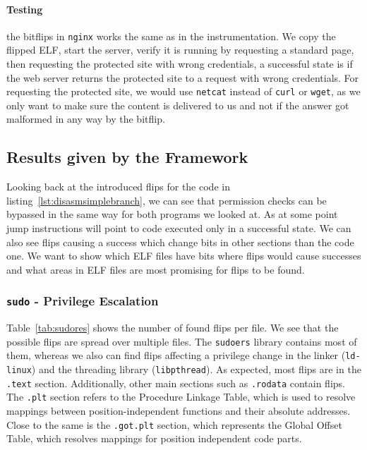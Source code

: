 \paragraph{Testing} the bitflips in \texttt{nginx} works the same as in the
instrumentation. We copy the flipped ELF, start the server, verify it is running
by requesting a standard page, then requesting the protected site with wrong
credentials, a successful state is if the web server returns the protected site
to a request with wrong credentials. For requesting the protected site, we would
use \texttt{netcat} instead of \texttt{curl} or \texttt{wget}, as we only want
to make sure the content is delivered to us and not if the answer got malformed
in any way by the bitflip.

\subsection{Results given by the Framework}

Looking back at the introduced flips for the code in
listing~\ref{lst:disasmsimplebranch}, we can see that permission checks can be
bypassed in the same way for both programs we looked at. As at some point jump
instructions will point to code executed only in a successful state. We can also
see flips causing a success which change bits in other sections than the code
one. We want to show which ELF files have bits where flips would cause
successes and what areas in ELF files are most promising for flips to be found.

\subsubsection{\texttt{sudo} - Privilege Escalation}

Table~\ref{tab:sudores} shows the number of found flips per file. We see that
the possible flips are spread over multiple files.  The \texttt{sudoers} library
contains most of them, whereas we also can find flips affecting a privilege
change in the linker (\texttt{ld-linux}) and the threading library
(\texttt{libpthread}). As expected, most flips are in the \texttt{.text}
section. Additionally, other main sections such as \texttt{.rodata} contain
flips. The \texttt{.plt} section refers to the Procedure Linkage Table, which is
used to resolve mappings between position-independent functions and their
absolute addresses. Close to the same is the \texttt{.got.plt} section, which
represents the Global Offset Table, which resolves mappings for position
independent code parts.

